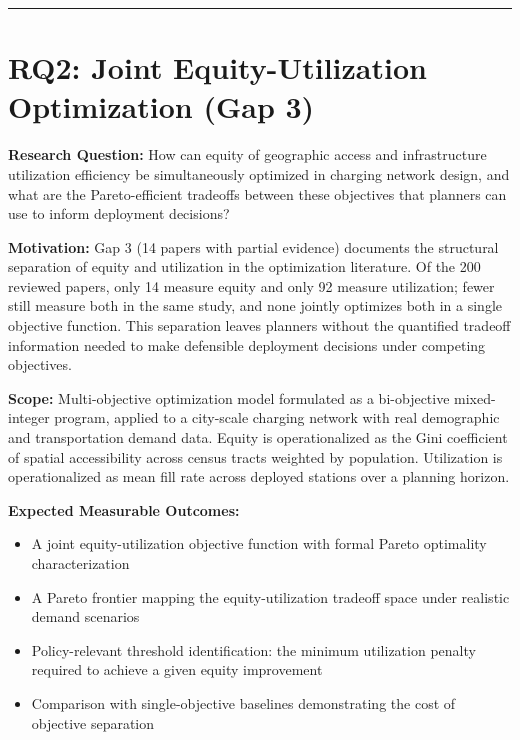 \documentclass[letterpaper, 12pt, oneside, doublespacing]{Thesis}
\begin{document}
\bigskip\noindent\rule{\linewidth}{0.4pt}\bigskip


\section{RQ2: Joint Equity-Utilization Optimization (Gap 3)}


\noindent \textbf{Research Question:} How can equity of geographic access and infrastructure utilization efficiency be simultaneously optimized in charging network design, and what are the Pareto-efficient tradeoffs between these objectives that planners can use to inform deployment decisions?



\noindent \textbf{Motivation:} Gap 3 (14 papers with partial evidence) documents the structural separation of equity and utilization in the optimization literature. Of the 200 reviewed papers, only 14 measure equity and only 92 measure utilization; fewer still measure both in the same study, and none jointly optimizes both in a single objective function. This separation leaves planners without the quantified tradeoff information needed to make defensible deployment decisions under competing objectives.



\noindent \textbf{Scope:} Multi-objective optimization model formulated as a bi-objective mixed-integer program, applied to a city-scale charging network with real demographic and transportation demand data. Equity is operationalized as the Gini coefficient of spatial accessibility across census tracts weighted by population. Utilization is operationalized as mean fill rate across deployed stations over a planning horizon.



\noindent \textbf{Expected Measurable Outcomes:}

\begin{itemize}
  \item A joint equity-utilization objective function with formal Pareto optimality characterization
  \item A Pareto frontier mapping the equity-utilization tradeoff space under realistic demand scenarios
  \item Policy-relevant threshold identification: the minimum utilization penalty required to achieve a given equity improvement
  \item Comparison with single-objective baselines demonstrating the cost of objective separation
\end{itemize}
\end{document}
